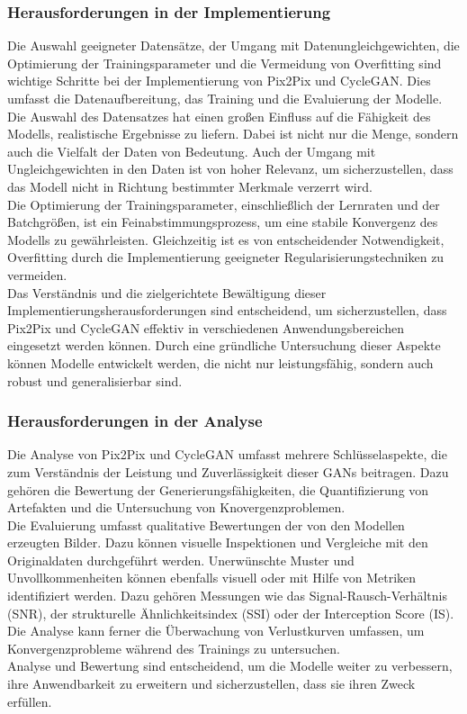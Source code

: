 \subsubsection{Herausforderungen in der Implementierung}
Die Auswahl geeigneter Datensätze, der Umgang mit Datenungleichgewichten, die Optimierung der Trainingsparameter und die Vermeidung von Overfitting sind wichtige Schritte bei der Implementierung von Pix2Pix und CycleGAN. Dies umfasst die Datenaufbereitung, das Training und die Evaluierung der Modelle. 
\\
Die Auswahl des Datensatzes hat einen großen Einfluss auf die Fähigkeit des Modells, realistische Ergebnisse zu liefern. Dabei ist nicht nur die Menge, sondern auch die Vielfalt der Daten von Bedeutung. Auch der Umgang mit Ungleichgewichten in den Daten ist von hoher Relevanz, um sicherzustellen, dass das Modell nicht in Richtung bestimmter Merkmale verzerrt wird.
\\
Die Optimierung der Trainingsparameter, einschließlich der Lernraten und der Batchgrößen, ist ein Feinabstimmungsprozess, um eine stabile Konvergenz des Modells zu gewährleisten. Gleichzeitig ist es von entscheidender Notwendigkeit, Overfitting durch die Implementierung geeigneter Regularisierungstechniken zu vermeiden.
\\
Das Verständnis und die zielgerichtete Bewältigung dieser Implementierungsherausforderungen sind entscheidend, um sicherzustellen, dass Pix2Pix und CycleGAN effektiv in verschiedenen Anwendungsbereichen eingesetzt werden können. Durch eine gründliche Untersuchung dieser Aspekte können Modelle entwickelt werden, die nicht nur leistungsfähig, sondern auch robust und generalisierbar sind.

\subsubsection{Herausforderungen in der Analyse}
Die Analyse von Pix2Pix und CycleGAN umfasst mehrere Schlüsselaspekte, die zum Verständnis der Leistung und Zuverlässigkeit dieser GANs beitragen. Dazu gehören die Bewertung der Generierungsfähigkeiten, die Quantifizierung von Artefakten und die Untersuchung von Knovergenzproblemen. 
\\
Die Evaluierung umfasst qualitative Bewertungen der von den Modellen erzeugten Bilder. Dazu können visuelle Inspektionen und Vergleiche mit den Originaldaten durchgeführt werden. Unerwünschte Muster und Unvollkommenheiten können ebenfalls visuell oder mit Hilfe von Metriken identifiziert werden. Dazu gehören Messungen wie das Signal-Rausch-Verhältnis (SNR), der strukturelle Ähnlichkeitsindex (SSI) oder der Interception Score (IS). \\ Die Analyse kann ferner die Überwachung von Verlustkurven umfassen, um Konvergenzprobleme während des Trainings zu untersuchen. 
\\
Analyse und Bewertung sind entscheidend, um die Modelle weiter zu verbessern, ihre Anwendbarkeit zu erweitern und sicherzustellen, dass sie ihren Zweck erfüllen.